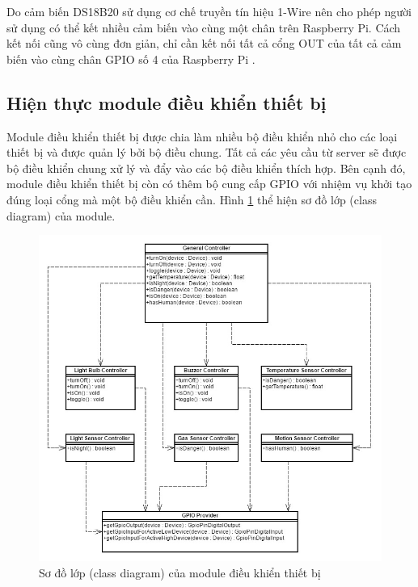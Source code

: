 \documentclass[12pt,a4paper,oneside]{extbook}
\begin{document}
\noindent
Do cảm biến DS18B20 sử dụng cơ chế truyền tín hiệu 1-Wire nên cho phép người sử dụng có thể kết nhiều cảm biến vào cùng một chân trên Raspberry Pi. Cách kết nối cũng vô cùng đơn giản, chỉ cần kết nối tất cả cổng OUT của tất cả cảm biến vào cùng chân GPIO số 4 của Raspberry Pi \cite{temp-sensor}.

\subsection{Hiện thực module điều khiển thiết bị}

Module điều khiển thiết bị được chia làm nhiều bộ điều khiển nhỏ cho các loại thiết bị và được quản lý bởi bộ điều chung. Tất cả các yêu cầu từ server sẽ được bộ điều khiển chung xử lý và đẩy vào các bộ điều khiển thích hợp. Bên cạnh đó, module điều khiển thiết bị còn có thêm bộ cung cấp GPIO với nhiệm vụ khởi tạo đúng loại cổng mà một bộ điều khiển cần. Hình \ref{fig:6-module-dieu-khien-class-diagram} thể hiện sơ đồ lớp (class diagram) của module.\\

\begin{figure}[h!]
  \centering
     \includegraphics[width=15.5cm]{6-module-dieu-khien-class-diagram}
  \caption{Sơ đồ lớp (class diagram) của module điều khiển thiết bị}\label{fig:6-module-dieu-khien-class-diagram}
\end{figure}
\end{document}
